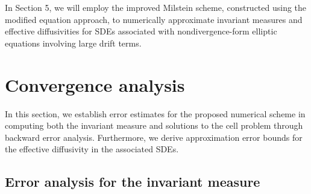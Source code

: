 \documentclass[12pt,a4paper,reqno]{amsart}
\numberwithin{equation}{section}
\begin{document}
In Section 5, we will employ the improved Milstein scheme, constructed using the modified equation approach, to numerically approximate invariant measures and effective diffusivities for SDEs associated with nondivergence-form elliptic equations involving large drift terms.


\section{Convergence analysis}  
\noindent

In this section, we establish error estimates for the proposed numerical scheme in computing both the invariant measure and solutions to the cell problem through backward error analysis. Furthermore, we derive approximation error bounds for the effective diffusivity in the associated SDEs.


\subsection{Error analysis for the invariant measure}  
\end{document}
